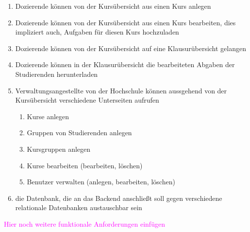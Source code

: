\begin{enumerate}
	\item Dozierende können von der Kursübersicht aus einen Kurs anlegen
	\item Dozierende können von der Kursübersicht aus einen Kurs bearbeiten, dies impliziert auch, Aufgaben für diesen Kurs hochzuladen
	\item Dozierende können von der Kursübersicht auf eine Klausurübersicht gelangen
	\item Dozierende können in der Klausurübersicht die bearbeiteten Abgaben der Studierenden herunterladen
	\item Verwaltungsangestellte von der Hochschule können aussgehend von der Kursübersicht verschiedene Unterseiten aufrufen
	\begin{enumerate}
		\item Kurse anlegen
	 	\item Gruppen von Studierenden anlegen
		\item Kursgruppen anlegen
		\item Kurse bearbeiten (bearbeiten, löschen)
		\item Benutzer verwalten (anlegen, bearbeiten, löschen)
	\end{enumerate}	 
	\item die Datenbank, die an das Backend anschließt soll gegen verschiedene relationale Datenbanken austauschbar sein
\end{enumerate}

\textcolor{magenta}{Hier noch weitere funktionale Anforderungen einfügen}